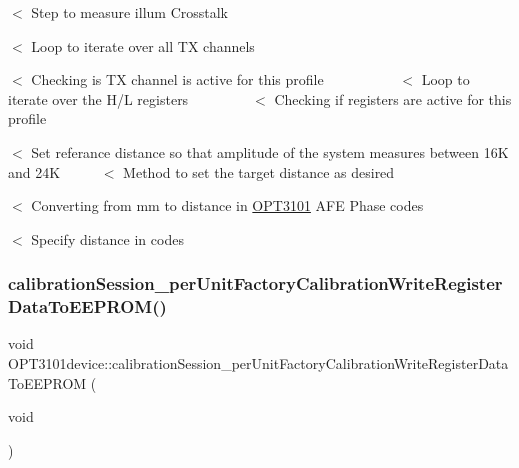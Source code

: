 $<$ Step to measure illum Crosstalk

$<$ Loop to iterate over all TX channels

$<$ Checking is TX channel is active for this profile ~\newline
~\newline
~\newline
~\newline
~\newline
~\newline
 $<$ Loop to iterate over the H/L registers ~\newline
~\newline
~\newline
~\newline
~\newline
 $<$ Checking if registers are active for this profile

$<$ Set referance distance so that amplitude of the system measures between 16K and 24K ~\newline
~\newline
~\newline
 $<$ Method to set the target distance as desired

$<$ Converting from mm to distance in \mbox{\hyperlink{namespace_o_p_t3101}{O\+P\+T3101}} A\+FE Phase codes

$<$ Specify distance in codes \mbox{\label{class_o_p_t3101device_a6d9e6e45e260f4af1a874b5075105792}} 
\subsubsection{\texorpdfstring{calibration\+Session\+\_\+per\+Unit\+Factory\+Calibration\+Write\+Register\+Data\+To\+E\+E\+P\+R\+O\+M()}{calibrationSession\_perUnitFactoryCalibrationWriteRegisterDataToEEPROM()}}
{\footnotesize\ttfamily void O\+P\+T3101device\+::calibration\+Session\+\_\+per\+Unit\+Factory\+Calibration\+Write\+Register\+Data\+To\+E\+E\+P\+R\+OM (\begin{DoxyParamCaption}\item[{void}]{ }\end{DoxyParamCaption})}

